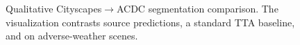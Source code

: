 \begin{figure}[t]
\centering
\fbox{\rule{0pt}{1.05in}\rule{0.94\columnwidth}{0pt}}
\caption{Qualitative Cityscapes$\rightarrow$ACDC segmentation comparison. The visualization contrasts source predictions, a standard TTA baseline, and \method{} on adverse-weather scenes.}
\label{fig:segqual}
\end{figure}
